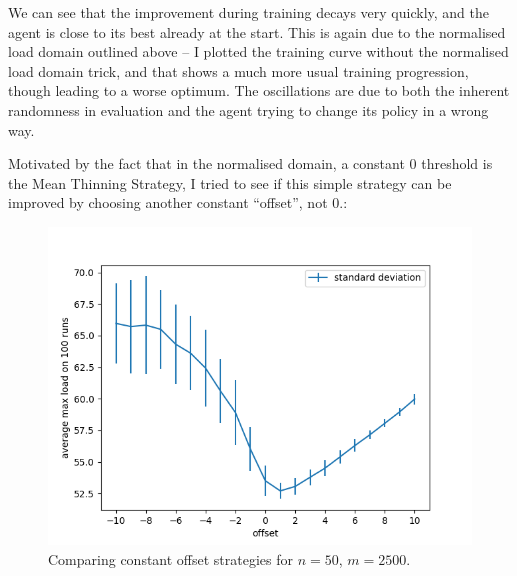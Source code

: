 We can see that the improvement during training decays very quickly, and the agent is close to its best already at the start. This is again due to the normalised load domain outlined above -- I plotted the training curve without the normalised load domain trick, and that shows a much more usual training progression, though leading to a worse optimum. The oscillations are due to both the inherent randomness in evaluation and the agent trying to change its policy in a wrong way.


Motivated by the fact that in the normalised domain, a constant $0$ threshold is the Mean Thinning Strategy, I tried to see if this simple strategy can be improved by choosing another constant ``offset'', not $0$.:

\begin{figure}[hbt!] \label{two-thinning-constant-offset}
    \centering
    \includegraphics[scale=1.0]{Chapter4/Figs/offset_analysis_50_2500.png}
    \caption{Comparing constant offset strategies for $n=50$, $m=2500$.}
\end{figure}



